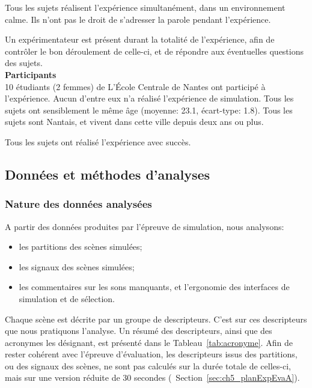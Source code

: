 Tous les sujets réalisent l'expérience simultanément, dans un environnement calme. Ils n'ont pas le droit de s'adresser la parole pendant l'expérience. 

Un expérimentateur est présent durant la totalité de l'expérience, afin de contrôler le bon déroulement de celle-ci, et de répondre aux éventuelles questions des sujets.  \\

{\setlength{\parindent}{0cm}\textbf{Participants}} \\

10 étudiants (2 femmes) de L’École Centrale de Nantes ont participé à l'expérience. Aucun d'entre eux n'a réalisé l'expérience de simulation. Tous les sujets ont sensiblement le même âge (moyenne: 23.1, écart-type: 1.8). Tous les sujets sont Nantais, et vivent dans cette ville depuis deux ans ou plus.

Tous les sujets ont réalisé l'expérience avec succès.

\subsection{Données et méthodes d'analyses}

\subsubsection{Nature des données analysées}
\label{sec:ch5_dataType1}

A partir des données produites par l'épreuve de simulation, nous analysons:

\begin{itemize}
\item les partitions des scènes simulées;
\item les signaux des scènes simulées;
\item les commentaires sur les sons manquants, et l'ergonomie des interfaces de simulation et de sélection.
\end{itemize}

Chaque scène est décrite par un groupe de descripteurs. C'est sur ces descripteurs que nous pratiquons l'analyse. Un résumé des descripteurs, ainsi que des acronymes les désignant, est présenté dans le Tableau~\ref{tab:acronyme}. Afin de rester cohérent avec l'épreuve d'évaluation, les descripteurs issus des partitions, ou des signaux des scènes, ne sont pas calculés sur la durée totale de celles-ci, mais sur une version réduite de 30 secondes (\cf~Section~\ref{sec:ch5_planExpEvaA}). 

